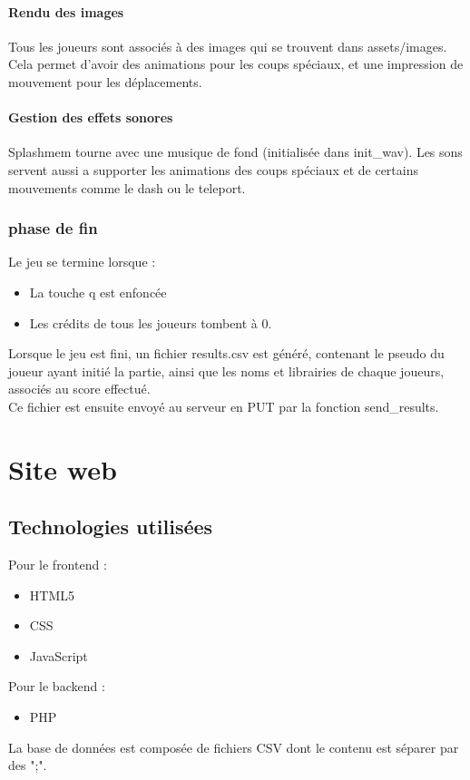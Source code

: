 \documentclass[12pt, openany]{article}
\begin{document}
	\paragraph{Rendu des images}
	Tous les joueurs sont associés à des images qui se trouvent dans assets/images. Cela permet d'avoir des animations pour les coups spéciaux, et une impression de mouvement pour les déplacements.
	
	\paragraph{Gestion des effets sonores}
	Splashmem tourne avec une musique de fond (initialisée dans init\_wav). Les sons servent aussi a supporter les animations des coups spéciaux et de certains mouvements comme le dash ou le teleport.
	
	\subsubsection{phase de fin}
	Le jeu se termine lorsque :
	\begin{itemize}
		\item La touche q est enfoncée\\
		\item Les crédits de tous les joueurs tombent à 0.\\
	\end{itemize}

	Lorsque le jeu est fini, un fichier results.csv est généré, contenant le pseudo du joueur ayant initié la partie, ainsi que les noms et librairies de chaque joueurs, associés au score effectué.\\
	Ce fichier est ensuite envoyé au serveur en PUT par la fonction send\_results.\\
	
	\section{Site web}
	\subsection{Technologies utilisées}
	Pour le frontend :
	\begin{itemize}[label=$-$]
		\item HTML5\\
		\item CSS\\
		\item JavaScript\\
	\end{itemize}
	Pour le backend :
	\begin{itemize}[label=$-$]
		\item PHP\\
	\end{itemize}
	La base de données est composée de fichiers CSV dont le contenu est séparer par des ";".\\
\end{document}
